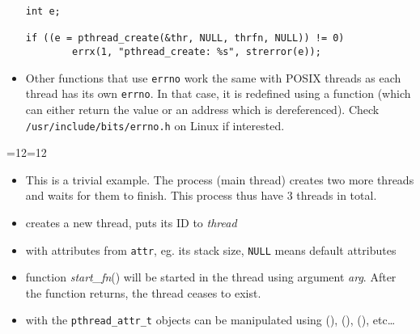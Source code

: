 \begin{itemize}
\begin{verbatim}
int e;

if ((e = pthread_create(&thr, NULL, thrfn, NULL)) != 0)
        errx(1, "pthread_create: %s", strerror(e));
\end{verbatim}

\item \label{ERRNO_IN_THREADS} Other functions that use \texttt{errno} work the
same with POSIX threads as each thread has its own \texttt{errno}.  In that
case, it is redefined using a function (which can either return the value or an
address which is dereferenced).  Check \texttt{/usr/include/bits/errno.h} on
Linux if interested.
\end{itemize}


\begin{slide}
{=12=12
\begin{center}

\end{center}}
\end{slide}

\begin{itemize}
\item This is a trivial example.  The process (main thread) creates two more
threads and waits for them to finish.  This process thus have 3 threads in
total.
\end{itemize}



\begin{slide}
\label{PTHREAD_T}
\begin{itemize}
\item creates a new thread, puts its ID to \emph{thread}
\item with attributes from \texttt{attr}, eg. its stack size,
\texttt{NULL} means default attributes
\item function \emph{start\_fn}() will be started in the thread using argument
\emph{arg}.  After the function returns, the thread ceases to exist.
\item with the \texttt{pthread\_attr\_t} objects can be manipulated using
(), (),
(), etc\dots{}
\end{itemize}
\end{slide}

